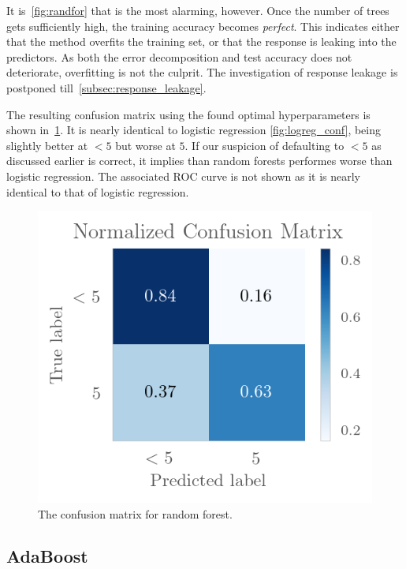 It is~\cref{fig:randfor} that is the most alarming, however. 
Once the number of trees gets sufficiently high, the training accuracy becomes
\textit{perfect}. This indicates either that the method overfits the training
set, or that the response is leaking into the predictors. As both the error decomposition and test accuracy does not deteriorate, overfitting is not the
culprit. The investigation of response leakage is postponed till~\cref{subsec:response_leakage}.

The resulting confusion matrix using the found optimal hyperparameters
is shown in~\cref{fig:randfor_conf}. It is nearly identical to logistic regression \cref{fig:logreg_conf}, being slightly better at $<5$ but worse at $5$. If our
suspicion of defaulting to $<5$ as discussed earlier is correct, it implies
than random forests performes worse than logistic regression. The associated
ROC curve is not shown as it is nearly identical to that of logistic regression.

\begin{figure}[H]
    \centering
    \includegraphics{Figures/randforest_conf.png}
    \caption{The confusion matrix for random forest.}
    \label{fig:randfor_conf}
\end{figure}

\subsection{AdaBoost}\label{subsec:adaboost}

